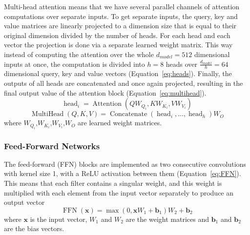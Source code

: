 \documentclass[12pt]{article}
\DeclareMathOperator{\Attention}{Attention}
\DeclareMathOperator{\MultiHead}{MultiHead}
\DeclareMathOperator{\Concatenate}{Concatenate}
\DeclareMathOperator{\head}{head}
\DeclareMathOperator{\FFN}{FFN}
\begin{document}
Multi-head attention means that we have several parallel channels of attention computations over separate inputs. To get separate inputs, the query, key and value matrices are linearly projected to a dimension size that is equal to their original dimension divided by the number of heads. For each head and each vector the projection is done via a separate learned weight matrix. This way instead of computing the attention over the whole \(d_{model}=512\) dimensional inputs at once, the computation is divided into \(h=8\) heads over \(\frac{d_{model}}{h}=64\) dimensional query, key and value vectors (Equation~\ref{eq:heads}). Finally, the outputs of all heads are concatenated and once again projected, resulting in the final output value of the attention block (Equation~\ref{eq:multihead}).
\begin{equation}\label{eq:heads}
\head_i=\Attention(QW_{Q_i},KW_{K_i},VW_{V_i})
\end{equation}
\begin{equation} \label{eq:multihead}
\MultiHead(Q,K,V)=\Concatenate(\head_i,...,\head_h)W_O
\end{equation}
where \(W_{Q_i}\),\(W_{K_i}\),\(W_{V_i}\),\(W_{O}\) are learned weight matrices.

\subsubsection{Feed-Forward Networks} \label{sssec:trf_nn}
The feed-forward (FFN) blocks are implemented as two consecutive convolutions with kernel size 1, with a ReLU activation between them (Equation~\ref{eq:FFN}). This means that each filter contains a singular weight, and this weight is multiplied with each element from the input vector separately to produce an output vector
\begin{equation} \label{eq:FFN}
\FFN(\bm{x})=\max(0,\bm{x}W_1+\bm{b}_1)W_2+\bm{b}_2
\end{equation}
where \(\bm{x}\) is the input vector, \(W_1\) and \(W_2\) are the weight matrices and \(\bm{b}_1\) and \(\bm{b}_2\) are the bias vectors.
\end{document}
